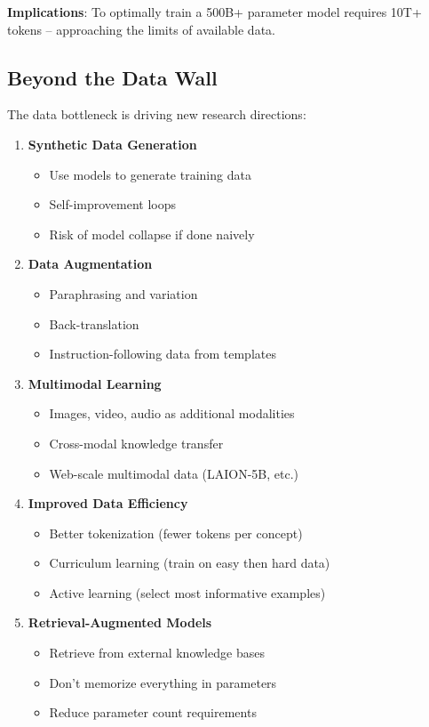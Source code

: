 \documentclass{article}
\begin{document}
\textbf{Implications}: To optimally train a 500B+ parameter model requires 10T+ tokens -- approaching the limits of available data.

\subsection{Beyond the Data Wall}

The data bottleneck is driving new research directions:

\begin{enumerate}
\item \textbf{Synthetic Data Generation}
\begin{itemize}
\item Use models to generate training data
\item Self-improvement loops
\item Risk of model collapse if done naively
\end{itemize}

\item \textbf{Data Augmentation}
\begin{itemize}
\item Paraphrasing and variation
\item Back-translation
\item Instruction-following data from templates
\end{itemize}

\item \textbf{Multimodal Learning}
\begin{itemize}
\item Images, video, audio as additional modalities
\item Cross-modal knowledge transfer
\item Web-scale multimodal data (LAION-5B, etc.)
\end{itemize}

\item \textbf{Improved Data Efficiency}
\begin{itemize}
\item Better tokenization (fewer tokens per concept)
\item Curriculum learning (train on easy then hard data)
\item Active learning (select most informative examples)
\end{itemize}

\item \textbf{Retrieval-Augmented Models}
\begin{itemize}
\item Retrieve from external knowledge bases
\item Don't memorize everything in parameters
\item Reduce parameter count requirements
\end{itemize}
\end{enumerate}
\end{document}
